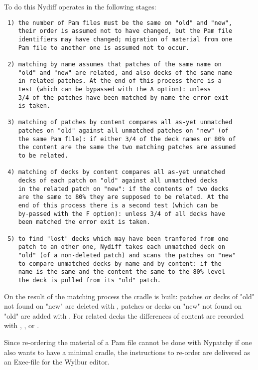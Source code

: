 To do this Nydiff operates in the following stages:
\begin{verbatim}
 1) the number of Pam files must be the same on "old" and "new",
    their order is assumed not to have changed, but the Pam file
    identifiers may have changed; migration of material from one
    Pam file to another one is assumed not to occur.

 2) matching by name assumes that patches of the same name on
    "old" and "new" are related, and also decks of the same name
    in related patches. At the end of this process there is a
    test (which can be bypassed with the A option): unless
    3/4 of the patches have been matched by name the error exit
    is taken.

 3) matching of patches by content compares all as-yet unmatched
    patches on "old" against all unmatched patches on "new" (of
    the same Pam file): if either 3/4 of the deck names or 80% of
    the content are the same the two matching patches are assumed
    to be related.

 4) matching of decks by content compares all as-yet unmatched
    decks of each patch on "old" against all unmatched decks
    in the related patch on "new": if the contents of two decks
    are the same to 80% they are supposed to be related. At the
    end of this process there is a second test (which can be
    by-passed with the F option): unless 3/4 of all decks have
    been matched the error exit is taken.

 5) to find "lost" decks which may have been tranfered from one
    patch to an other one, Nydiff takes each unmatched deck on
    "old" (of a non-deleted patch) and scans the patches on "new"
    to compare unmatched decks by name and by content: if the
    name is the same and the content the same to the 80% level
    the deck is pulled from its "old" patch.
\end{verbatim}
On the result of the matching process the cradle is built:
patches or decks of "old" not found on "new" are deleted with
, patches or decks on "new" not found on "old" are
added with . For related decks the differences of content
are recorded with , , or .

Since re-ordering the material of a Pam file cannot be done
with Nypatchy if one also wants to have a minimal cradle,
the instructions to re-order are delivered as an Exec-file
for the Wylbur editor.

